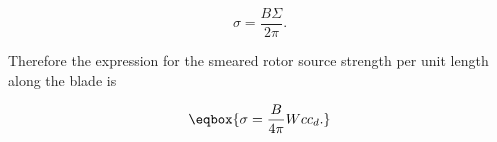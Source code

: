 \begin{equation}
    \sigma = \frac{B \Sigma}{2 \pi}.
\end{equation}

Therefore the expression for the smeared rotor source strength per unit length along the blade is


\begin{equation}
    \label{eqn:rotorsourcestrengths}
    \eqbox{
        \sigma = \frac{B}{4 \pi} W c c_d.
    }
\end{equation}


%
%
%
%
%
%
%
%






